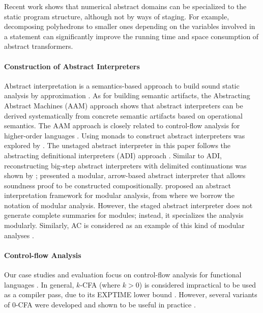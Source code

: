 Recent work shows that numerical abstract domains can be
specialized to the static program structure, although not by
ways of staging. For example, decomposing polyhedrons
\cite{DBLP:conf/popl/SinghPV17, Singh:2017:PCD:3177123.3158143} to
smaller ones depending on the variables involved in a statement can
significantly improve the running time and space consumption of abstract
transformers.

\paragraph{Construction of Abstract Interpreters} Abstract interpretation is a
semantics-based approach to build sound static analysis by approximation
\cite{DBLP:conf/popl/CousotC77, Cousot98-5}.
As for building semantic artifacts, the Abstracting Abstract Machines (AAM)
\cite{DBLP:journals/jfp/HornM12, DBLP:conf/icfp/HornM10} approach shows that
abstract interpreters can be derived systematically from concrete semantic
artifacts based on operational semantics.
The AAM approach is closely related to control-flow analysis for higher-order languages
\cite{Midtgaard:2012:CAF:2187671.2187672, Shivers:1991:SSC:115865.115884}.
Using monads to construct abstract interpreters was explored by
\citet{Sergey:2013:MAI:2491956.2491979, DBLP:journals/pacmpl/DaraisLNH17,
Darais:2015:GTM:2814270.2814308}.
The unstaged abstract interpreter in this paper follows the abstracting
definitional interpreters (ADI) approach \cite{DBLP:journals/pacmpl/DaraisLNH17}.  
Similar to ADI, reconstructing
big-step abstract interpreters with delimited continuations was shown by
\citet{Wei:2018:RAA:3243631.3236800}; \citet{Keidel:2018:CSP:3243631.3236767}
presented a modular, arrow-based abstract interpreter that allows soundness
proof to be constructed compositionally.
\citet{DBLP:conf/cc/CousotC02} proposed an abstract interpretation framework for
modular analysis, from where we borrow the notation of modular analysis.
However, the staged abstract interpreter does not generate complete summaries for
modules; instead, it specializes the analysis modularly. Similarly, AC
is considered as an example of this kind of modular analyses \cite{DBLP:conf/cc/CousotC02}.

\paragraph{Control-flow Analysis} Our case studies and evaluation focus on
control-flow analysis for functional languages
\cite{Shivers:1991:SSC:115865.115884, Midtgaard:2012:CAF:2187671.2187672}. In
general, $k$-CFA (where $k > 0$) is considered impractical to be used as a
compiler pass, due to its EXPTIME lower bound
\cite{VanHorn:2008:DKC:1411204.1411243}.  However, several variants of 0-CFA
were developed and shown to be useful in practice
\cite{Adams:2011:FTR:2048066.2048105, Bergstrom:2014:PEH:2628136.2628153,
ashley:practical, Reppy:2006:TCA:1159876.1159888}.

